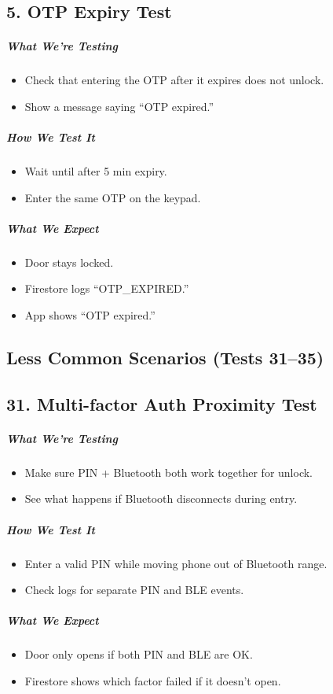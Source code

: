 \subsection*{5. OTP Expiry Test}
\subparagraph{What We’re Testing}
\begin{itemize}
    \item Check that entering the OTP after it expires does not unlock.
    \item Show a message saying “OTP expired.”
\end{itemize}
\subparagraph{How We Test It}
\begin{itemize}
    \item Wait until after 5 min expiry.
    \item Enter the same OTP on the keypad.
\end{itemize}
\subparagraph{What We Expect}
\begin{itemize}
    \item Door stays locked.
    \item Firestore logs “OTP\_EXPIRED.”
    \item App shows “OTP expired.”
\end{itemize}

\newpage
\subsection*{Less Common Scenarios (Tests 31–35)}

\subsection*{31. Multi-factor Auth Proximity Test}
\subparagraph{What We’re Testing}
\begin{itemize}
    \item Make sure PIN + Bluetooth both work together for unlock.
    \item See what happens if Bluetooth disconnects during entry.
\end{itemize}
\subparagraph{How We Test It}
\begin{itemize}
    \item Enter a valid PIN while moving phone out of Bluetooth range.
    \item Check logs for separate PIN and BLE events.
\end{itemize}
\subparagraph{What We Expect}
\begin{itemize}
    \item Door only opens if both PIN and BLE are OK.
    \item Firestore shows which factor failed if it doesn’t open.
\end{itemize}

